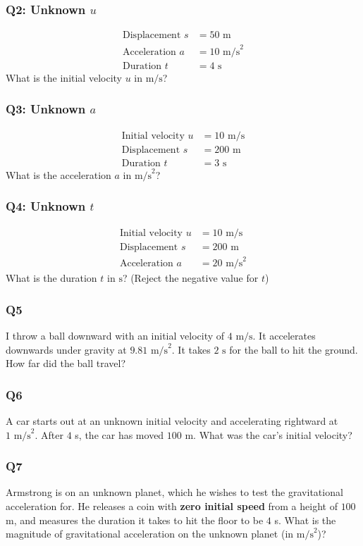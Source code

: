 \documentclass{article}
\begin{document}
\subsubsection{Q2: Unknown $u$}
\begin{align}
\text{Displacement } s&=50 \text{ m}\\
\text{Acceleration }a&=10 \text{ m/s}^2\\
\text{Duration }t&=4 \text{ s}
\end{align}
What is the initial velocity $u$ in $\text{m/s}$?
\subsubsection{Q3: Unknown $a$}
\begin{align}
\text{Initial velocity } u&=10 \text{ m/s}\\
\text{Displacement }s&=200 \text{ m}\\
\text{Duration }t&=3 \text{ s}
\end{align}
What is the acceleration $a$ in $\text{m/s}^2$?
\subsubsection{Q4: Unknown $t$}
\begin{align}
\text{Initial velocity } u&=10 \text{ m/s}\\
\text{Displacement }s&=200 \text{ m}\\
\text{Acceleration }a&=20 \text{ m/s}^2
\end{align}
What is the duration $t$ in $\text{s}$? (Reject the negative value for $t$)
\subsubsection{Q5}
I throw a ball downward with an initial velocity of $4 \text{ m/s}$. It accelerates downwards under gravity at $9.81 \text{ m/s}^2$. It takes $2 \text{ s}$ for the ball to hit the ground. How far did the ball travel? 
\subsubsection{Q6}
A car starts out at an unknown initial velocity and accelerating rightward at $1 \text{ m/s}^2$. After $4$ s, the car has moved $100$ m. What was the car's initial velocity? 
\subsubsection{Q7}
Armstrong is on an unknown planet, which he wishes to test the gravitational acceleration for. He releases a coin with \textbf{zero initial speed} from a height of $100$ m, and measures the duration it takes to hit the floor to be $4$ s. What is the magnitude of gravitational acceleration on the unknown planet (in $\text{m/s}^2$)?
\end{document}
